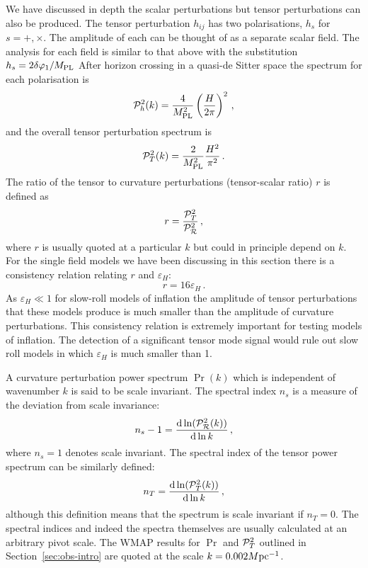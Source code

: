 We have discussed in depth the scalar perturbations but tensor perturbations
can also be produced. The tensor perturbation $h_{ij}$
has two polarisations, $h_s$ for $s=+, \times$. The amplitude of
each can be thought of as a separate scalar field. The analysis for each field
is similar to that above with the substitution $h_s= 2\delta\varphi_{1}/M_{\mathrm{PL}}$ After horizon
crossing in a quasi-de Sitter space the spectrum for each polarisation is
% 
\begin{equation}
 \mathcal{P}_h^2(k) = \frac{4}{M_{\mathrm{PL}}^2} \left(\frac{H}{2\pi}\right)^2\,,
\end{equation}
% 
and the overall tensor perturbation spectrum is
% 
\begin{equation}
 \label{eq:Ptdefn-intro}
\mathcal{P}_T^2(k) = \frac{2}{M_{\mathrm{PL}}^2} \frac{H^2}{\pi^2}\,.
\end{equation}
The ratio of the tensor to curvature perturbations (tensor-scalar ratio) $r$ is
defined as 
% 
\begin{equation}
 r = \frac{\mathcal{P}_T^2}{\mathcal{P}_{\mathcal{R}}^2 }\,,
\end{equation}
% 
where $r$ is usually quoted at a particular $k$ but could in principle depend
on $k$. For the single field models we have been discussing in this section
there is a consistency relation relating $r$ and $\varepsilon_H$:
% 
\begin{equation}
\label{eq:consistency-intro}
 r = 16 \varepsilon_H\,.
\end{equation}
As $\varepsilon_H\ll1$ for slow-roll models of inflation the amplitude of tensor
perturbations that these models produce is much smaller than the amplitude of
curvature perturbations. This consistency relation is extremely important for
testing models of inflation. The detection of a significant tensor mode signal
would rule out slow roll models in which $\varepsilon_H$ is much smaller than 1.



A curvature perturbation power spectrum $\Pr(k)$ which is independent of
wavenumber $k$ is said to be scale invariant. The spectral index $n_s$ is a
measure of the deviation from scale invariance:
% 
\begin{equation}
\label{eq:nsdefn-intro}
 n_s -1 = \frac{\mathrm{d} \ln (\mathcal{P}_{\mathcal{R}}^2 (k))}{\mathrm{d} \ln k}\,,
\end{equation}
% 
where $n_s=1$ denotes scale invariant. The spectral index of
the tensor power spectrum can be similarly defined:
% 
\begin{equation}
\label{eq:ntdefn-intro}
 n_T = \frac{\mathrm{d} \ln(\mathcal{P}_T^2(k))}{\mathrm{d} \ln k}\,,
\end{equation}
although this definition means that the spectrum is scale invariant if
$n_T=0$.
The spectral indices and indeed the spectra themselves are usually calculated
at an arbitrary pivot scale. The WMAP results for $\Pr$ and $\mathcal{P}_T^2$ outlined in
Section~\ref{sec:obs-intro} are quoted at the scale $k=0.002M \mathrm{pc}^{-1}$.



